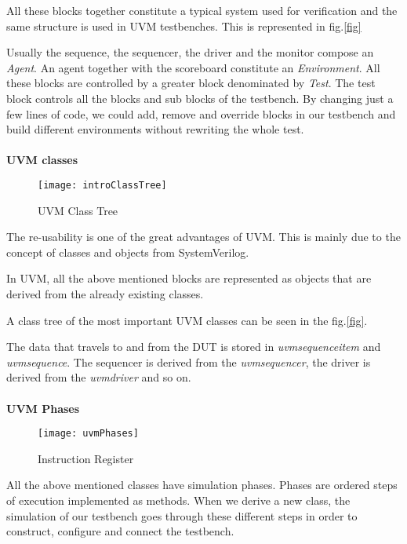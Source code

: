\documentclass[a4paper,11pt]{article}
\begin{document}
All these blocks together constitute a typical system used for verification and the same structure is used in UVM testbenches. This is represented in fig.\ref{fig}

Usually the sequence, the sequencer, the driver and the monitor compose an \textit{Agent}. An agent together with the scoreboard constitute an \textit{Environment}. All these blocks are controlled by a greater block denominated by \textit{Test}. The test block controls all the blocks and sub blocks of the testbench. By changing just a few lines of code, we could add, remove and override blocks in our testbench and build different environments without rewriting the whole test.
\ \\
\ \\
\textbf{UVM classes}
\ \\

\begin{figure}[ht]
\centering
\texttt{[image: introClassTree]}
\caption{UVM Class Tree}
\end{figure}

The re-usability is one of the great advantages of UVM. This is mainly due to the concept of classes and objects from SystemVerilog.

In UVM, all the above mentioned blocks are represented as objects that are derived from the already existing classes.

A class tree of the most important UVM classes can be seen in the fig.\ref{fig}.

The data that travels to and from the DUT is stored in \textit{uvm\textunderscore sequence\textunderscore item} and \textit{uvm\textunderscore sequence}. The sequencer is derived from the \textit{uvm\textunderscore sequencer}, the driver is derived from the \textit{uvm\textunderscore driver} and so on.
\ \\
\ \\
\textbf{UVM Phases}
\ \\

\begin{figure}[ht]
\centering
\texttt{[image: uvmPhases]}
\caption{Instruction Register}
\end{figure}

All the above mentioned classes have simulation phases. Phases are ordered steps of execution implemented as methods. When we derive a new class, the simulation of our testbench goes through these different steps in order to construct, configure and connect the testbench.
\end{document}
